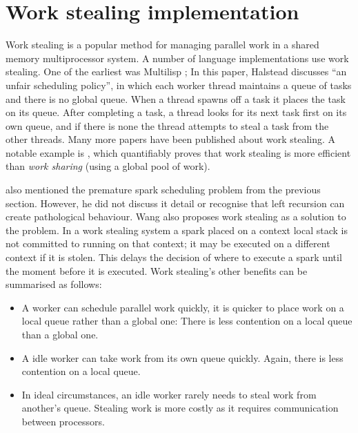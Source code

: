 \section{Work stealing implementation}
\label{sec:work_stealing}

Work stealing is a popular method for managing parallel work in a shared
memory multiprocessor system.
A number of language implementations use work stealing.
One of the earliest was Multilisp \citep{halstead:1985:multilisp};
In this paper,
Halstead discusses ``an unfair scheduling policy'',
in which each worker thread maintains a queue of tasks
and there is no global queue.
When a thread spawns off a task it places the task on its queue.
After completing a task, a thread looks for its next task first 
on its own queue, and if there is none
the thread attempts to steal a task from the other threads.
Many more papers have been published about work stealing.
A notable example is
\citet{blumofe:1999:work-stealing},
which quantifiably proves that work stealing is more efficient than
\emph{work sharing}
(using a global pool of work).

\citet{wangp-hons} also mentioned the premature spark scheduling problem
from the previous section.
However, he did not discuss it detail or
recognise that left recursion can create pathological behaviour.
Wang also proposes work stealing as a solution to the problem.
In a work stealing system a spark placed on a context local stack
is not committed to running on that context;
it may be executed on a different context if it is stolen.
This delays the decision of where to execute a spark until the moment
before it is executed.
Work stealing's other benefits can be summarised as follows:

\begin{itemize}

    \item
    A worker can schedule parallel work quickly,
    it is quicker to place work on a local queue rather than a global
    one:
    There is less contention on a local queue than a global one.

    \item
    A idle worker can take work from its own queue quickly.
    Again, there is less contention on a local queue.

    \item
    In ideal circumstances,
    an idle worker rarely needs to steal work from another's queue.
    Stealing work is more costly as it requires communication between
    processors.

\end{itemize}

